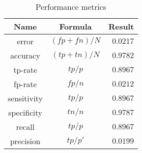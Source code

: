 \begin{table}
    \centering
    \begin{tabular}{|c|c|r|}\hline
    Name        & Formula       &   Result      \\\hline
    error       & $(fp+fn)/N$   &   $0.0217$    \\
    accuracy    & $(tp+tn)/N$   &   $0.9782$    \\\hline
    tp-rate     & $tp/p$        &   $0.8967$    \\
    fp-rate     & $fp/n$        &   $0.0212$    \\\hline
    sensitivity & $tp/p$        &   $0.8967$    \\
    specificity & $tn/n$        &   $0.9787$    \\\hline
    recall      & $tp/p$        &   $0.8967$    \\
    precision   & $tp/p'$       &   $0.0199$    \\\hline
    \end{tabular}
    \caption[\project's performance]{Performance metrics \project}
    \label{tab:performance}
\end{table}